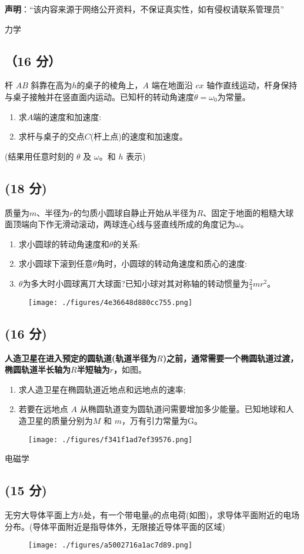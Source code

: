 
\textbf{声明}：“该内容来源于网络公开资料，不保证真实性，如有侵权请联系管理员”

力学
\subsection{（16 分）}
杆 $AB$ 斜靠在高为$h$的桌子的棱角上，$A$ 端在地面沿 $cx$ 轴作直线运动，杆身保持与桌子接触并在竖直面内运动。已知杆的转动角速度$\dot{\theta}=\omega_{0}$为常量。
\begin{enumerate}
\item 求$A$端的速度和加速度:
\item 求杆与桌子的交点$C$(杆上点)的速度和加速度。
\end{enumerate}
(结果用任意时刻的 $\theta$ 及 $\omega$。和 $h$ 表示)
\subsection{(18 分)}
质量为$m$、半径为$r$的匀质小圆球自静止开始从半径为$R$、固定于地面的粗糙大球面顶端向下作无滑动滚动，两球连心线与竖直线所成的角度记为$\omega$。
\begin{enumerate}
\item 求小圆球的转动角速度和$\theta$的关系:
\item 求小圆球下滚到任意$\theta$角时，小圆球的转动角速度和质心的速度:
\item $\theta$为多大时小圆球离丌大球面?已知小球对其对称轴的转动惯量为$\frac{2}{4}mr^2$。
\end{enumerate}
\begin{figure}[ht]
\centering
\texttt{[image: ./figures/4e36648d880cc755.png]}
\caption{} \label{fig_PKU004_1}
\end{figure}
\subsection{(16 分) }
\textbf{人造卫星在进入预定的圆轨道(轨道半径为$R$)之前，通常需要一个椭圆轨道过渡，椭圆轨道半长轴为$R$半短轴为$r$，}如图。
\begin{enumerate}
\item 求人造卫星在椭圆轨道近地点和远地点的速率;
\item 若要在远地点 $A$ 从椭圆轨道变为圆轨道问需要增加多少能量。已知地球和人造卫星的质量分别为$M$ 和 $m$，万有引力常量为G。
\end{enumerate}
\begin{figure}[ht]
\centering
\texttt{[image: ./figures/f341f1ad7ef39576.png]}
\caption{} \label{fig_PKU004_2}
\end{figure}

电磁学

\subsection{(15 分)}
无穷大导体平面上方$h$处，有一个带电量$q$的点电荷(如图)，求导体平面附近的电场分布。(导体平面附近是指导体外，无限接近导体平面的区域)
\begin{figure}[ht]
\centering
\texttt{[image: ./figures/a5002716a1ac7d89.png]}
\caption{} \label{fig_PKU004_3}
\end{figure}